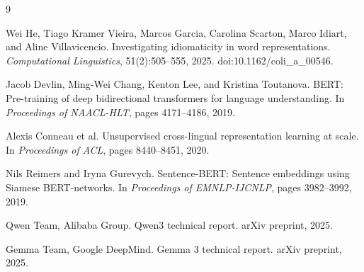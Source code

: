 \documentclass[11pt]{article}
\begin{document}
\begin{thebibliography}{9}

Wei He, Tiago Kramer Vieira, Marcos Garcia, Carolina Scarton, Marco Idiart, and Aline Villavicencio.
\newblock Investigating idiomaticity in word representations.
\newblock \emph{Computational Linguistics}, 51(2):505--555, 2025. doi:10.1162/coli\_a\_00546.

Jacob Devlin, Ming-Wei Chang, Kenton Lee, and Kristina Toutanova.
\newblock BERT: Pre-training of deep bidirectional transformers for language understanding.
\newblock In \emph{Proceedings of NAACL-HLT}, pages 4171--4186, 2019.

Alexis Conneau et al.
\newblock Unsupervised cross-lingual representation learning at scale.
\newblock In \emph{Proceedings of ACL}, pages 8440--8451, 2020.

Nils Reimers and Iryna Gurevych.
\newblock Sentence-BERT: Sentence embeddings using Siamese BERT-networks.
\newblock In \emph{Proceedings of EMNLP-IJCNLP}, pages 3982--3992, 2019.

Qwen Team, Alibaba Group.
\newblock Qwen3 technical report.
\newblock arXiv preprint, 2025.

Gemma Team, Google DeepMind.
\newblock Gemma 3 technical report.
\newblock arXiv preprint, 2025.

\end{thebibliography}
\end{document}
